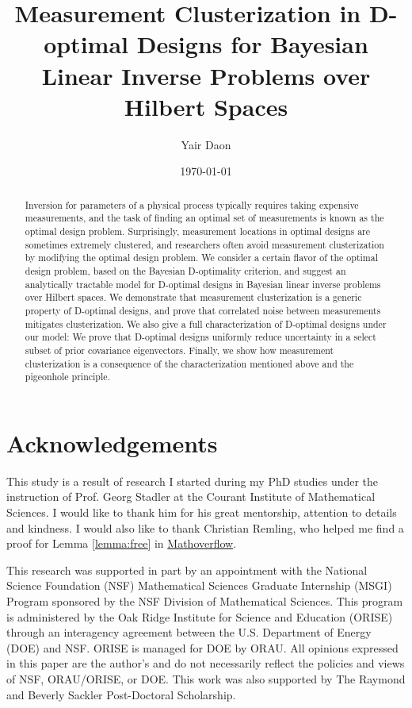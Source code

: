 \documentclass{amsart}
\title[Measurement Clusterization in D-optimal Designs]{Measurement
  Clusterization in D-optimal Designs for Bayesian Linear Inverse
  Problems over Hilbert Spaces}
\author{Yair Daon}
\date{\today}
\begin{document}
\begin{abstract}
  Inversion for parameters of a physical process typically requires taking expensive measurements, and the task of finding an optimal set of measurements is known as the optimal design problem. Surprisingly, measurement locations in optimal designs are sometimes extremely clustered, and researchers often avoid measurement clusterization by modifying the optimal design problem. We consider a certain flavor of the optimal design problem, based on the Bayesian D-optimality criterion, and suggest an analytically tractable model for D-optimal designs in Bayesian linear inverse problems over Hilbert spaces. We demonstrate that measurement clusterization is a generic property of D-optimal designs, and prove that correlated noise between measurements mitigates clusterization. We also give a full characterization of D-optimal designs under our model: We prove that D-optimal designs uniformly reduce uncertainty in a select subset of prior covariance eigenvectors. Finally, we show how measurement clusterization is a consequence of the characterization mentioned above and the pigeonhole principle.
\end{abstract}
\maketitle










\section{Acknowledgements}
This study is a result of research I started during my PhD studies
under the instruction of Prof. Georg Stadler at the Courant Institute
of Mathematical Sciences. I would like to thank him for his great
mentorship, attention to details and kindness. I would also like to
thank Christian Remling, who helped me find a proof for Lemma
\ref{lemma:free} in
\href{https://mathoverflow.net/questions/280168/redistribute-diagonal-entries-of-a-matrix/280203#280203c}{Mathoverflow}.

This research was supported in part by an appointment with the
National Science Foundation (NSF) Mathematical Sciences Graduate
Internship (MSGI) Program sponsored by the NSF Division of
Mathematical Sciences. This program is administered by the Oak Ridge
Institute for Science and Education (ORISE) through an interagency
agreement between the U.S. Department of Energy (DOE) and NSF. ORISE
is managed for DOE by ORAU. All opinions expressed in this paper are
the author's and do not necessarily reflect the policies and views of
NSF, ORAU/ORISE, or DOE. This work was also supported by The Raymond
and Beverly Sackler Post-Doctoral Scholarship.



%


\end{document}
